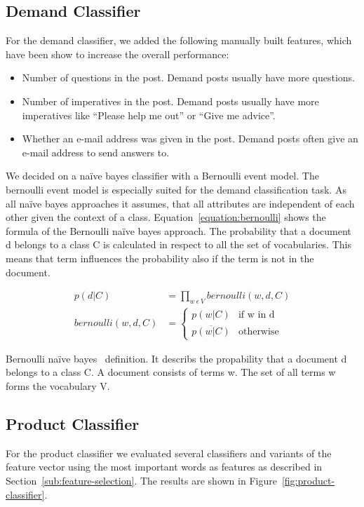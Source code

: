 \subsection{Demand Classifier}
For the demand classifier, we added the following manually built features, which have been show to increase the overall performance:
\begin{itemize}
	\item Number of questions in the post. Demand posts usually have more questions.
	\item Number of imperatives in the post. Demand posts usually have more imperatives like ``Please help me out'' or ``Give me advice''.
	\item Whether an e-mail address was given in the post. Demand posts often give an e-mail address to send answers to.
\end{itemize}

We decided on a na\"{i}ve bayes classifier with a Bernoulli event model.
The bernoulli event model is especially suited for the demand classification task.
As all na\"{i}ve bayes approaches it assumes, that all attributes are independent of each other given the context of a class.
Equation~\ref{equation:bernoulli} shows the formula of the Bernoulli na\"{i}ve bayes approach.
The probability that a document d belongs to a class C is calculated in respect to all the set of vocabularies.
This means that term influences the probability also if the term is not in the document.

\captionsetup{singlelinecheck=off}
\begin{equationBlock}
\begin{align*}
	\label{equation:bernoulli}
	p(d|C) &= \prod_{w~\epsilon~V} bernoulli(w, d, C) \\
	bernoulli(w, d, C) &=
	\begin{cases}
		p(w|C) 					&\text{if w in d}\\
		\overline{p(w|C)} 		&\text{otherwise}
	\end{cases}
	\end{align*}
	\caption{
		Bernoulli na\"{i}ve bayes~\cite{mccallum1998comparison} definition. 
		It describs the propability that a document d belongs to a class C. 
		A document consists of terms w. 
		The set of all terms w forms the vocabulary V. 
}
\end{equationBlock}

\subsection{Product Classifier}
For the product classifier we evaluated several classifiers and variants of the feature vector using the most important words as features as described in Section~\ref{sub:feature-selection}.
The results are shown in Figure~\ref{fig:product-classifier}.

